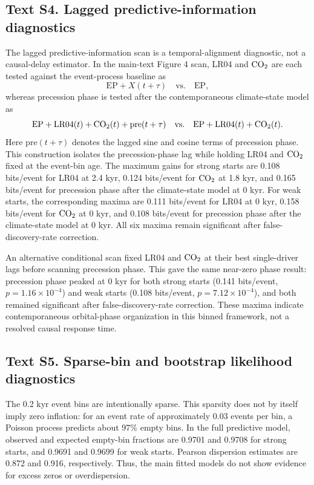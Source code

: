 \documentclass[11pt]{article}
\begin{document}
\subsection*{Text S4. Lagged predictive-information diagnostics}

The lagged predictive-information scan is a temporal-alignment diagnostic, not a causal-delay estimator. In the main-text Figure 4 scan, LR04 and \(\ce{CO2}\) are each tested against the event-process baseline as
\[
\mathrm{EP}+X(t+\tau)\quad \mathrm{vs.}\quad \mathrm{EP},
\]
whereas precession phase is tested after the contemporaneous climate-state model as
\[
\mathrm{EP}+\mathrm{LR04}(t)+\ce{CO2}(t)+\mathrm{pre}(t+\tau)
\quad \mathrm{vs.}\quad
\mathrm{EP}+\mathrm{LR04}(t)+\ce{CO2}(t).
\]
Here \(\mathrm{pre}(t+\tau)\) denotes the lagged sine and cosine terms of precession phase. This construction isolates the precession-phase lag while holding LR04 and \(\ce{CO2}\) fixed at the event-bin age. The maximum gains for strong starts are 0.108 bits/event for LR04 at 2.4 kyr, 0.124 bits/event for \(\ce{CO2}\) at 1.8 kyr, and 0.165 bits/event for precession phase after the climate-state model at 0 kyr. For weak starts, the corresponding maxima are 0.111 bits/event for LR04 at 0 kyr, 0.158 bits/event for \(\ce{CO2}\) at 0 kyr, and 0.108 bits/event for precession phase after the climate-state model at 0 kyr. All six maxima remain significant after false-discovery-rate correction.

An alternative conditional scan fixed LR04 and \(\ce{CO2}\) at their best single-driver lags before scanning precession phase. This gave the same near-zero phase result: precession phase peaked at 0 kyr for both strong starts (0.141 bits/event, \(p=1.16\times10^{-4}\)) and weak starts (0.108 bits/event, \(p=7.12\times10^{-4}\)), and both remained significant after false-discovery-rate correction. These maxima indicate contemporaneous orbital-phase organization in this binned framework, not a resolved causal response time.

\subsection*{Text S5. Sparse-bin and bootstrap likelihood diagnostics}

The 0.2 kyr event bins are intentionally sparse. This sparsity does not by itself imply zero inflation: for an event rate of approximately 0.03 events per bin, a Poisson process predicts about 97\% empty bins. In the full predictive model, observed and expected empty-bin fractions are 0.9701 and 0.9708 for strong starts, and 0.9691 and 0.9699 for weak starts. Pearson dispersion estimates are 0.872 and 0.916, respectively. Thus, the main fitted models do not show evidence for excess zeros or overdispersion.
\end{document}
